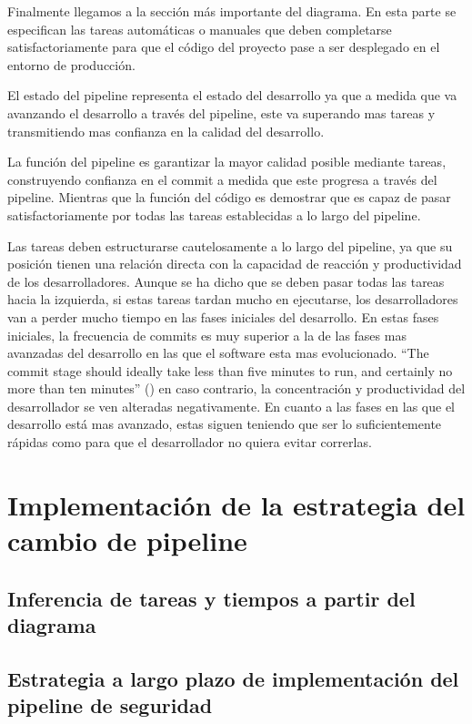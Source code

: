 \documentclass[12pt]{report} %
\begin{document}
Finalmente llegamos a la sección más importante del diagrama.  En esta parte se
especifican las tareas automáticas o manuales que deben completarse
satisfactoriamente para que el código del proyecto pase a ser desplegado en el
entorno de producción.  

El estado del \gls{pipeline} representa el estado del desarrollo ya que a medida
que va avanzando el desarrollo a través del \gls{pipeline}, este va superando
mas tareas y transmitiendo mas confianza en la calidad del desarrollo.

La función del pipeline es 
garantizar la mayor calidad posible mediante tareas, construyendo confianza en
el \gls{commit} a medida que este progresa a través del \gls{pipeline}.
Mientras que la función del código es demostrar que es
capaz de pasar satisfactoriamente por todas las tareas establecidas a lo
largo del \gls{pipeline}.
 
Las tareas deben estructurarse cautelosamente a lo largo del \gls{pipeline}, ya que su posición tienen una relación directa
con la capacidad de reacción y productividad de los desarrolladores.
Aunque se ha dicho que se deben pasar todas las tareas hacia la izquierda, si
estas tareas tardan mucho en ejecutarse, los desarrolladores van a perder mucho
tiempo en las fases iniciales del desarrollo.
En estas fases iniciales, la frecuencia de commits es muy superior a la de las
fases mas avanzadas del desarrollo en las que el software esta mas evolucionado.
``The commit stage should ideally take less than five minutes to run, and
certainly no more than ten minutes'' (\cite{Humble2010}) en caso contrario, la concentración y productividad del
desarrollador se ven alteradas negativamente.
En cuanto a las fases en las que el desarrollo está mas avanzado, estas siguen
teniendo que ser lo suficientemente rápidas como para que el desarrollador no
quiera evitar correrlas.


\section{Implementación de la estrategia del cambio de pipeline}

\subsection{Inferencia de tareas y tiempos a partir del diagrama}

\subsection{Estrategia a largo plazo de implementación del pipeline de
seguridad}
\end{document}
